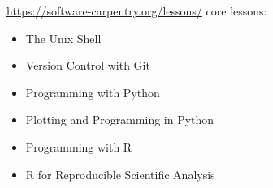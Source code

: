 
\url{https://software-carpentry.org/lessons/} core lessons:
\begin{itemize}
\item 
The Unix Shell
\item 
Version Control with Git
\item 
Programming with Python
\item 
Plotting and Programming in Python
\item 
Programming with R
\item 
R for Reproducible Scientific Analysis
\end{itemize}
